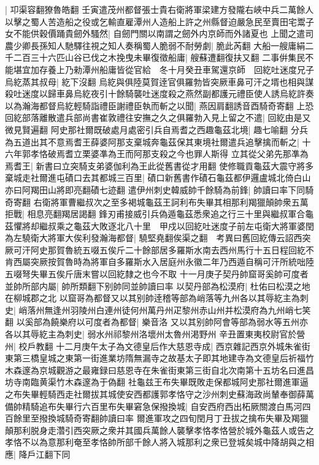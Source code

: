 |{
	卭渠容翻獠魯皓翻}
壬寅遣茂州都督張士貴右衛將軍梁建方發隴右峽中兵二萬餘人以擊之蜀人苦造船之役或乞輸直雇潭州人造船上許之州縣督迫嚴急民至賣田宅鬻子女不能供穀價踊貴劒外騷然|{
	自劒門關以南謂之劒外内京師而外諸夏也}
上聞之遣司農少卿長孫知人馳驛往視之知人奏稱蜀人脆弱不耐勞劇|{
	脆此芮翻}
大船一艘庸絹二千二百三十六匹山谷已伐之木挽曳未畢復徵船庸|{
	艘蘇遭翻復扶又翻}
二事倂集民不能堪宜加存養上乃勑潭州船庸皆從官給　冬十月癸丑車駕還京師　回紇吐迷度兄子烏紇蒸其叔母|{
	紇下沒翻}
烏紇與俱陸莫賀逹官俱羅勃皆突厥車鼻可汗之壻也相與謀殺吐迷度以歸車鼻烏紇夜引十餘騎襲吐迷度殺之燕然副都護元禮臣使人誘烏紇許奏以為瀚海都督烏紇輕騎詣禮臣謝禮臣執而斬之以聞|{
	燕因肩翻誘音酉騎奇寄翻}
上恐回紇部落離散遣兵部尚書崔敦禮往安撫之久之俱羅勃入見上留之不遣|{
	回紇由是又微見賢遍翻}
阿史那社爾既破處月處密引兵自焉耆之西趣龜茲北境|{
	趣七喻翻}
分兵為五道出其不意焉耆王薛婆阿那支棄城奔龜茲保其東境社爾遣兵追擊擒而斬之|{
	十六年郭孝恪破焉耆立栗婆凖為王而阿那支殺之今也罪人斯得}
立其從父弟先那凖為焉耆王|{
	新書曰立突騎支弟婆伽利為王此從舊書從才用翻}
使修職貢龜茲大震守將多棄城走社爾進屯磧口去其都城三百里|{
	磧口新舊書作磧石龜茲都伊邏盧城北倚白山亦曰阿羯田山將即亮翻磧七迹翻}
遣伊州刺史韓威帥千餘騎為前鋒|{
	帥讀曰率下同騎奇寄翻}
右衛將軍曹繼叔次之至多褐城龜茲王訶利布失畢其相那利羯獵顛帥衆五萬拒戰|{
	相息亮翻羯居謁翻}
鋒刃甫接威引兵偽遁龜茲悉衆追之行三十里與繼叔軍合龜茲懼將却繼叔乘之龜茲大敗逐北八十里　甲戍以回紇吐迷度子前左屯衛大將軍婆閏為左驍衛大將軍大俟利發瀚海都督|{
	驍堅堯翻俟渠之翻　考異曰舊回紇傳云詔西突厥可汗阿史那賀魯統五啜五俟斤二十餘部居多羅斯水南去西州馬行十五日程回紇不肯西屬突厥按賀魯時為將軍自多羅斯水入居庭州永徽二年乃西遁自稱可汗所統咄陸五啜弩失畢五俟斤唐末嘗以回紇隸之也今不取}
十一月庚子契丹帥窟哥奚帥可度者並帥所部内屬|{
	帥所類翻下别帥同並帥讀曰率}
以契丹部為松漠府|{
	杜佑曰松漠之地在柳城郡之北}
以窟哥為都督又以其别帥逹稽等部為峭落等九州各以其辱紇主為刺史|{
	峭落州無逢州羽陵州白連州徒何州萬丹州疋黎州赤山州并松漠府為九州峭七笑翻}
以奚部為饒樂府以可度者為都督|{
	樂音洛}
又以其别帥阿會等部為弱水等五州亦各以其辱紇主為刺史|{
	弱水州祁黎州洛壞州太魯州渇野州}
辛丑置東夷校尉官於營州|{
	校戶教翻}
十二月庚午太子為文德皇后作大慈恩寺成|{
	西京雜記西京外城朱雀街東第三橋皇城之東第一街進業坊隋無漏寺之故基太子即其地建寺為文德皇后祈福竹木森邃為京城觀游之最雍録曰慈恩寺在朱雀街東第三街自北次南第十五坊名曰進昌坊寺南臨黄渠竹木森邃為于偽翻}
社龜兹王布失畢既敗走保都城阿史那社爾進軍逼之布失畢輕騎西走社爾拔其城使安西都護郭孝恪守之沙州刺史蘇海政尚輦奉御薛萬備帥精騎追布失畢行六百里布失畢窘急保撥換城|{
	自安西府西出柘厥關渡白馬河四百餘里至撥換城騎奇寄翻帥讀曰率}
爾進軍攻之四旬閏月丁丑拔之擒布失畢及羯獵顛那利脱身走濳引西突厥之衆并其國兵萬餘人襲擊孝恪孝恪營於城外龜茲人或告之孝恪不以為意那利奄至孝恪帥所部千餘人將入城那利之衆已登城矣城中降胡與之相應|{
	降戶江翻下同}
